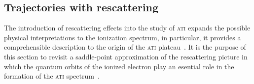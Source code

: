 \subsection{\label{sec:spa_resc} Trajectories with rescattering}

The introduction of rescattering effects into the study of
\textsc{ati} expands the possible physical interpretations to the
ionization spectrum, in particular, it provides a comprehensible
description to the origin of the \textsc{ati}
plateau~\cite{Paulus_1994plateau,BeckerRescattering_2018}. It is the
purpose of this section to revisit a saddle-point approximation of the
rescattering picture in which the quantum orbits of the ionized
electron play an esential role in the formation of the \textsc{ati}
spectrum~\cite{KopoldOptComm2000}.

